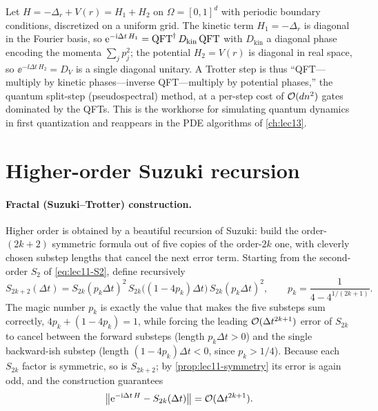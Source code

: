 \begin{example}
\label{exa:lec11-schrodinger}
Let $H=-\Delta_r+V(r)=H_1+H_2$ on $\Omega=[0,1]^d$ with periodic boundary conditions,
discretized on a uniform grid. The kinetic term $H_1=-\Delta_r$ is diagonal in the
Fourier basis, so $\mathrm{e}^{-\mathrm{i}\Delta t\,H_1}=\mathrm{QFT}^{\dagger}\,D_{\mathrm{kin}}\,\mathrm{QFT}$
with $D_{\mathrm{kin}}$ a diagonal phase encoding the momenta $\sum_j p_j^2$; the
potential $H_2=V(r)$ is diagonal in real space, so $\ee^{-\ii\Delta t\,H_2}=D_{V}$ is a
single diagonal unitary. A Trotter step is thus ``QFT---multiply by kinetic phases---inverse
QFT---multiply by potential phases,'' the quantum split-step (pseudospectral) method, at a
per-step cost of $\mathcal{O}(dn^2)$ gates dominated by the QFTs. This is the workhorse for
simulating quantum dynamics in first quantization and reappears in the PDE algorithms of
\cref{ch:lec13}.
\end{example}

\section{Higher-order Suzuki recursion}
\label{sec:lec11-3}

\paragraph{Fractal (Suzuki--Trotter) construction.}
Higher order is obtained by a beautiful recursion of Suzuki: build the order-$(2k+2)$
symmetric formula out of five copies of the order-$2k$ one, with cleverly chosen
substep lengths that cancel the next error term. Starting from the second-order $S_2$ of
\eqref{eq:lec11-S2}, define recursively
\begin{equation}
  S_{2k+2}(\Delta t)=S_{2k}(p_k\Delta t)^2\,S_{2k}\bigl((1-4p_k)\Delta t\bigr)\,
    S_{2k}(p_k\Delta t)^2,\qquad
  p_k=\frac{1}{4-4^{1/(2k+1)}}.
  \label{eq:lec11-suzuki}
\end{equation}
The magic number $p_k$ is exactly the value that makes the five substeps sum correctly,
$4p_k+(1-4p_k)=1$, while forcing the leading $\mathcal{O}(\Delta t^{2k+1})$ error of $S_{2k}$ to
cancel between the forward substeps (length $p_k\Delta t>0$) and the single backward-ish
substep (length $(1-4p_k)\Delta t<0$, since $p_k>1/4$). Because each $S_{2k}$ factor is
symmetric, so is $S_{2k+2}$; by \cref{prop:lec11-symmetry} its error is again odd, and the
construction guarantees
\begin{equation}
  \left\lVert \mathrm{e}^{-\mathrm{i}\Delta t\,H}-S_{2k}(\Delta t) \right\rVert=\mathcal{O}(\Delta t^{2k+1}).
  \label{eq:lec11-suzuki-local}
\end{equation}

